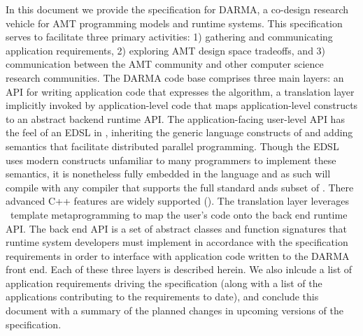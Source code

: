 
In this document we provide the specification for DARMA,
a co-design research vehicle for \gls{AMT} programming models and runtime
systems.  This specification serves to facilitate three primary activities: 
1) gathering and communicating application requirements, 2) exploring AMT
design space tradeoffs, and 3) communication between the AMT community and
other computer science research communities.
The DARMA code base comprises three main layers: 
an API for writing application code that expresses the algorithm,  
a translation layer implicitly invoked by application-level code that maps application-level constructs
to an abstract backend runtime API.
The application-facing user-level \gls{API} has the feel of an \gls{EDSL} in \CC,  
inheriting the generic language constructs of \CC and adding \gls{semantics} that facilitate
distributed parallel programming.  
Though the \gls{EDSL} uses modern \CC constructs unfamiliar to many programmers to implement these semantics, 
it is nonetheless fully embedded in the \CC language and as such will compile with any
\CC compiler that supports the full  standard ands subset of .
There advanced C++ features are widely supported ().  
The \gls{translation layer} leverages \CC\ \gls{template
metaprogramming} to map the user's code onto the \gls{back end} runtime \gls{API}.
The \gls{back end} \gls{API} is a set of abstract classes and function
signatures that runtime system developers must implement in accordance with the
specification requirements in order to interface with application code written
to the DARMA front end.  
Each of these three layers is described herein. We also
inlcude a list of application requirements driving the specification (along
with a list of the applications contributing to the requirements to date), and
conclude this document with a summary of the planned changes in upcoming
versions of the specification.


